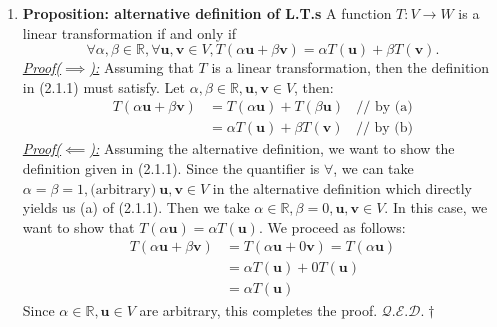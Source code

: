 \documentclass[oneside, 12pt]{book}
\newcommand{\settag}[1]{\renewcommand{\theenumi}{#1}}
\newcommand{\R}{\mathbb{R}}
\newcommand{\qed}{\hfill $\mathcal{Q}.\mathcal{E}.\mathcal{D}.\dagger$}
\newcommand{\tbf}[1]{\textbf{#1}}
\newcommand{\tit}[1]{\textit{#1}}
\begin{document}
\begin{enumerate}
        \settag{2.1.2}
        \item \tbf{Proposition: alternative definition of L.T.s} A function $T:V\xrightarrow{}W$ is a linear transformation if and only if 
        \begin{equation*}
            \forall \alpha,\beta \in \R, \forall \mathbf{u}, \mathbf{v} \in V, T(\alpha \mathbf{u}+\beta \mathbf{v})=\alpha T(\mathbf{u}) + \beta T(\mathbf{v}).
        \end{equation*}
        \tit{\underline{Proof($\implies$):}}\newline
        Assuming that $T$ is a linear transformation, then the definition in (2.1.1) must satisfy. Let $\alpha,\beta \in \R, \mathbf{u},\mathbf{v}\in V$, then: 
        \begin{align*}
            T(\alpha\mathbf{u} + \beta\mathbf{v}) &= T(\alpha\mathbf{u}) + T(\beta\mathbf{u})~~~~\text{// by (a)} \\
            &= \alpha T(\mathbf{u}) + \beta T(\mathbf{v})~~~~\text{// by (b)}
        \end{align*}
        \tit{\underline{Proof($\impliedby$):}}\newline
        Assuming the alternative definition, we want to show the definition given in (2.1.1). Since the quantifier is $\forall$, we can take $\alpha = \beta  =1, \text{(arbitrary)}~\mathbf{u},\mathbf{v}\in V$ in the alternative definition which directly yields us (a) of (2.1.1). Then we take $\alpha \in \R, \beta =0, \mathbf{u}, \mathbf{v}\in V$. In this case, we want to show that $T(\alpha \mathbf{u}) = \alpha T(\mathbf{u})$. We proceed as follows: 
        \begin{align*}
            T(\alpha\mathbf{u} + \beta\mathbf{v}) &= T(\alpha\mathbf{u} + 0\mathbf{v}) = T(\alpha\mathbf{u})\\
            &= \alpha T(\mathbf{u}) + 0T(\mathbf{u}) \\
            &= \alpha T(\mathbf{u})
        \end{align*}
        Since $\alpha\in \R, \mathbf{u}\in V$ are arbitrary, this completes the proof. \qed
        

\end{enumerate}
\end{document}
